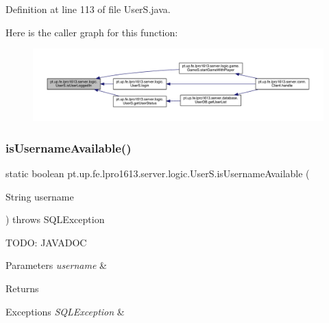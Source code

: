 Definition at line 113 of file User\+S.\+java.

Here is the caller graph for this function\+:
\nopagebreak
\begin{figure}[H]
\begin{center}
\leavevmode
\includegraphics[width=350pt]{classpt_1_1up_1_1fe_1_1lpro1613_1_1server_1_1logic_1_1_user_s_af0725775fa11525afa9299d198d69b2a_icgraph}
\end{center}
\end{figure}
\hypertarget{classpt_1_1up_1_1fe_1_1lpro1613_1_1server_1_1logic_1_1_user_s_a9c89c0a0ef730b38021033e58f7911cd}{}\label{classpt_1_1up_1_1fe_1_1lpro1613_1_1server_1_1logic_1_1_user_s_a9c89c0a0ef730b38021033e58f7911cd} 
\subsubsection{\texorpdfstring{is\+Username\+Available()}{isUsernameAvailable()}}
{\footnotesize\ttfamily static boolean pt.\+up.\+fe.\+lpro1613.\+server.\+logic.\+User\+S.\+is\+Username\+Available (\begin{DoxyParamCaption}\item[{String}]{username }\end{DoxyParamCaption}) throws S\+Q\+L\+Exception\hspace{0.3cm}{\ttfamily [static]}}

T\+O\+DO\+: J\+A\+V\+A\+D\+OC 
\begin{DoxyParams}{Parameters}
{\em username} & \\
\hline
\end{DoxyParams}
\begin{DoxyReturn}{Returns}

\end{DoxyReturn}

\begin{DoxyExceptions}{Exceptions}
{\em S\+Q\+L\+Exception} & \\
\hline
\end{DoxyExceptions}


